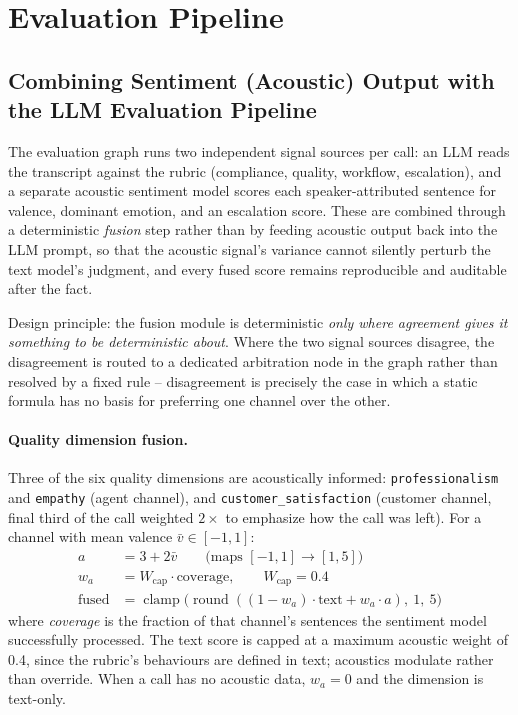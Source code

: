 \section{Evaluation Pipeline}

\subsection{Combining Sentiment (Acoustic) Output with the LLM Evaluation Pipeline}

The evaluation graph runs two independent signal sources per call: an LLM
reads the transcript against the rubric (compliance, quality, workflow,
escalation), and a separate acoustic sentiment model scores each
speaker-attributed sentence for valence, dominant emotion, and an
escalation score. These are combined through a deterministic \emph{fusion}
step rather than by feeding acoustic output back into the LLM prompt, so
that the acoustic signal's variance cannot silently perturb the text
model's judgment, and every fused score remains reproducible and
auditable after the fact.

Design principle: the fusion module is deterministic \emph{only where
agreement gives it something to be deterministic about}. Where the two
signal sources disagree, the disagreement is routed to a dedicated
arbitration node in the graph rather than resolved by a fixed rule --
disagreement is precisely the case in which a static formula has no basis
for preferring one channel over the other.

\paragraph{Quality dimension fusion.}
Three of the six quality dimensions are acoustically informed:
\texttt{professionalism} and \texttt{empathy} (agent channel),
and \texttt{customer\_satisfaction} (customer channel, final third of the
call weighted $2\times$ to emphasize how the call was left). For a channel
with mean valence $\bar v \in [-1, 1]$:
\begin{align}
  a &= 3 + 2\bar v \qquad \text{(maps $[-1,1] \to [1,5]$)} \\
  w_a &= W_{\text{cap}} \cdot \text{coverage}, \qquad W_{\text{cap}} = 0.4 \\
  \text{fused} &= \operatorname{clamp}\big(\operatorname{round}((1-w_a)\cdot \text{text} + w_a \cdot a),\ 1,\ 5\big)
\end{align}
where \emph{coverage} is the fraction of that channel's sentences the
sentiment model successfully processed. The text score is capped at a
maximum acoustic weight of 0.4, since the rubric's behaviours are defined
in text; acoustics modulate rather than override. When a call has no
acoustic data, $w_a = 0$ and the dimension is text-only.

